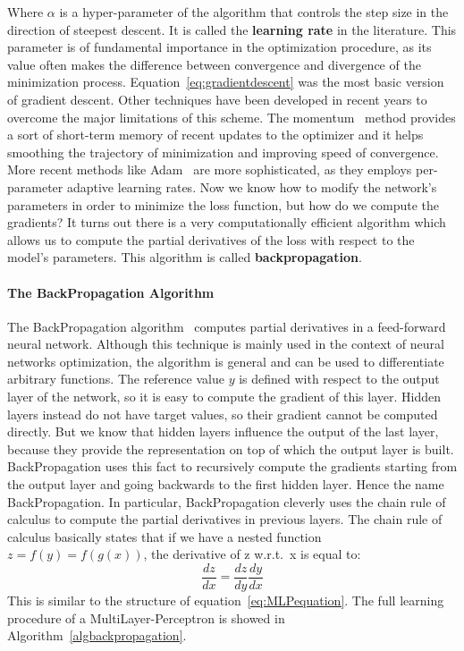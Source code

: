 \documentclass[../main.tex]{subfiles}
\begin{document}
    Where $\alpha$ is a hyper-parameter of the algorithm that controls the step size in the direction of steepest descent. It is called the
    \textbf{learning rate} in the literature. This parameter is of fundamental importance in the optimization procedure, as its value often
    makes the difference between convergence and divergence of the minimization process. Equation~\eqref{eq:gradientdescent} was the most basic
    version of gradient descent. Other techniques have been developed in recent years to overcome the major limitations of this scheme.
    The momentum~\cite{momentum} method provides a sort of short-term memory of recent updates to the optimizer and it helps smoothing the
    trajectory of minimization and improving speed of convergence. More recent methods like Adam~\cite{adam} are more sophisticated, as
    they employs per-parameter adaptive learning rates.
	\newline
    Now we know how to modify the network's parameters in order to minimize the loss function, but how do we compute the gradients?
    It turns out there is a very computationally efficient algorithm which allows us to compute the partial derivatives of the loss with
    respect to the model's parameters. This algorithm is called \textbf{backpropagation}.

    \paragraph{The BackPropagation Algorithm}
    The BackPropagation algorithm~\cite{backprop} computes partial derivatives in a feed-forward neural network. Although this
	technique is mainly used in the context of neural networks optimization, the algorithm is general and can be used to differentiate
	arbitrary functions.
	\newline
	The reference value $y$ is defined with respect to the output layer of the network, so it is easy to compute the gradient of this
	layer. Hidden layers instead do not have target values, so their gradient cannot be computed directly. But we know that hidden layers
	influence the output of the last layer, because they provide the representation on top of which the output layer is built. BackPropagation
	uses this fact to recursively compute the gradients starting from the output layer and going backwards to the first hidden layer. Hence the
	name BackPropagation. In particular, BackPropagation cleverly uses the chain rule of calculus to compute the partial derivatives
	in previous layers. The chain rule of calculus basically states that if we have a nested function
    $ z = f(y) = f(g(x)) $, the derivative of z w.r.t.\ x is equal to:
    $$ \frac{dz}{dx}  = \frac{dz}{dy} \frac{dy}{dx} $$
    This is similar to the structure of equation~\eqref{eq:MLPequation}. The full learning procedure of a MultiLayer-Perceptron is showed in Algorithm~\ref{algbackpropagation}.
\end{document}
